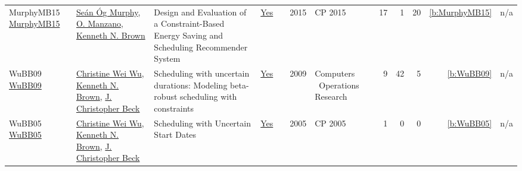 {\begin{longtable}{>{\raggedright\arraybackslash}p{3cm}>{\raggedright\arraybackslash}p{6cm}>{\raggedright\arraybackslash}p{6.5cm}rrrp{2.5cm}rrrrr}
MurphyMB15 \href{https://doi.org/10.1007/978-3-319-23219-5_47}{MurphyMB15} & \hyperref[auth:a220]{Se{\'{a}}n {\'{O}}g Murphy}, \hyperref[auth:a221]{O. Manzano}, \hyperref[auth:a222]{Kenneth N. Brown} & Design and Evaluation of a Constraint-Based Energy Saving and Scheduling Recommender System & \href{../works/MurphyMB15.pdf}{Yes} & \cite{MurphyMB15} & 2015 & CP 2015 & 17 & 1 & 20 & \ref{b:MurphyMB15} & n/a\\
WuBB09 \href{https://doi.org/10.1016/j.cor.2008.08.008}{WuBB09} & \hyperref[auth:a276]{Christine Wei Wu}, \hyperref[auth:a222]{Kenneth N. Brown}, \hyperref[auth:a89]{J. Christopher Beck} & Scheduling with uncertain durations: Modeling beta-robust scheduling with constraints & \href{../works/WuBB09.pdf}{Yes} & \cite{WuBB09} & 2009 & Computers \  Operations Research & 9 & 42 & 5 & \ref{b:WuBB09} & n/a\\
WuBB05 \href{https://doi.org/10.1007/11564751_110}{WuBB05} & \hyperref[auth:a276]{Christine Wei Wu}, \hyperref[auth:a222]{Kenneth N. Brown}, \hyperref[auth:a89]{J. Christopher Beck} & Scheduling with Uncertain Start Dates & \href{../works/WuBB05.pdf}{Yes} & \cite{WuBB05} & 2005 & CP 2005 & 1 & 0 & 0 & \ref{b:WuBB05} & n/a\\
\end{longtable}
}

\clearpage
